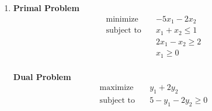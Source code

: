 \begin{enumerate}
\begin{enumerate}
\begin{minipage}[t]{0.45\textwidth}
\begin{align*}
                                                    & x_1, x_2, x_3 \geq 0
                        \end{align*}
                    \end{minipage}
                    \hfill
                    \begin{minipage}[t]{0.45\textwidth}
                        \textbf{Dual Problem}
                        \begin{align*}
                            \text{maximize} \quad   & 2y_1 - 4y_2 + y_3 + 14y_4                             \\
                            \text{subject to} \quad & 2 - 5y_1 - 5y_2 - y_3 - y_4 \geq 0                    \\
                                                    & -1 + 4y_1 - y_3 - 2y_4 \geq 0                         \\
                                                    & 1 - 3y_1 + y_2 - y_4 \geq 0                           \\
                                                    & y_1, y_4 \leq 0, y_2 \geq 0, y_3 \text{ unrestricted}
                        \end{align*}
                    \end{minipage}
              \item        \begin{minipage}[t]{0.45\textwidth}
                        \textbf{Primal Problem}
                        \begin{align*}
                            \text{minimize} \quad   & -5x_1 -2x_2       \\
                            \text{subject to} \quad & x_1 + x_2 \leq 1  \\
                                                    & 2x_1 - x_2 \geq 2 \\
                                                    & x_1 \geq 0        \\
                        \end{align*}
                    \end{minipage}
                    \hfill
                    \begin{minipage}[t]{0.45\textwidth}
                        \textbf{Dual Problem}
                        \begin{align*}
                            \text{maximize} \quad   & y_1 + 2y_2             \\
                            \text{subject to} \quad & 5 - y_1 - 2y_2 \geq 0  \\

\end{align*}
\end{minipage}
\end{enumerate}
\end{enumerate}
